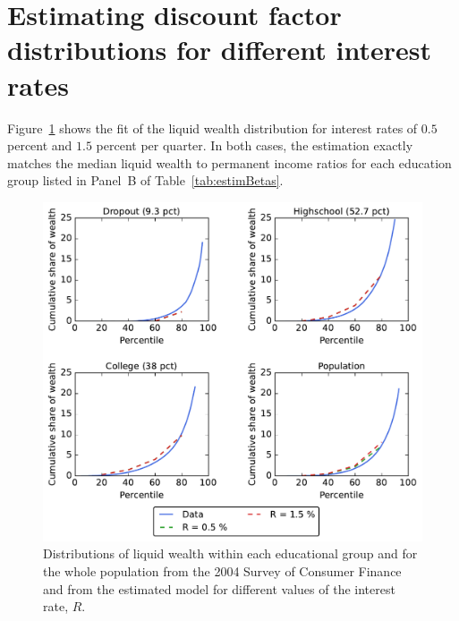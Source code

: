 \documentclass[../HAFiscal]{subfiles}
\begin{document}
\section{Estimating discount factor distributions for different interest rates}
\label{app:DF_R}

Figure~\ref{fig:LorenzPts_robustness_R} shows the fit of the liquid wealth distribution for interest rates of $0.5$ percent and $1.5$ percent per quarter. In both cases, the estimation exactly matches the median liquid wealth to permanent income ratios for each education group listed in Panel~B of Table~\ref{tab:estimBetas}. 


\begin{figure}[th]
	\begin{center}
		\includegraphics[width=.9\textwidth]{../Figures/LorenzPoints_robustness_R.pdf}
		\caption{Distributions of liquid wealth within each educational group and for the whole population from the 2004 Survey of Consumer Finance and from the estimated model for different values of the interest rate, $R$.}
		\label{fig:LorenzPts_robustness_R}
	\end{center}
\end{figure}
\end{document}
